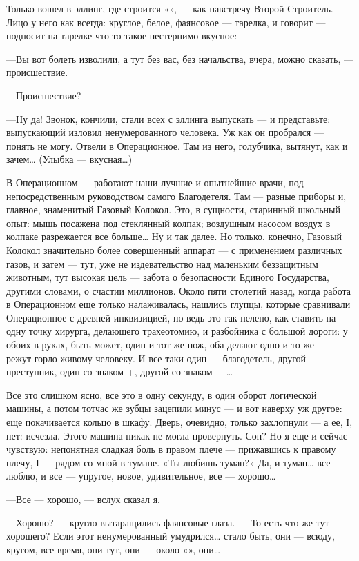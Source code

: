 \documentclass[11pt,openany]{book}
\begin{document}
Только вошел в эллинг, где строится «», --- как навстречу Второй Строитель. Лицо у него как всегда: круглое, белое, фаянсовое --- тарелка, и говорит --- подносит на тарелке что-то такое нестерпимо-вкусное:

---Вы вот болеть изволили, а тут без вас, без начальства, вчера, можно сказать, --- происшествие.

---Происшествие?

---Ну да! Звонок, кончили, стали всех с эллинга выпускать --- и представьте: выпускающий изловил ненумерованного человека. Уж как он пробрался --- понять не могу. Отвели в Операционное. Там из него, голубчика, вытянут, как и зачем\ldots{} (Улыбка --- вкусная\ldots{})

В Операционном --- работают наши лучшие и опытнейшие врачи, под непосредственным руководством самого Благодетеля. Там --- разные приборы и, главное, знаменитый Газовый Колокол. Это, в сущности, старинный школьный опыт: мышь посажена под стеклянный колпак; воздушным насосом воздух в колпаке разрежается все больше\ldots{} Ну и так далее. Но только, конечно, Газовый Колокол значительно более совершенный аппарат --- с применением различных газов, и затем --- тут,  уже не издевательство над маленьким беззащитным животным, тут высокая цель --- забота о безопасности Единого Государства, другими словами, о счастии миллионов. Около пяти столетий назад, когда работа в Операционном еще только налаживалась, нашлись глупцы, которые сравнивали Операционное с древней инквизицией, но ведь это так нелепо, как ставить на одну точку хирурга, делающего трахеотомию, и разбойника с большой дороги: у обоих в руках, быть может, один и тот же нож, оба делают одно и то же --- режут горло живому человеку. И все-таки один --- благодетель, другой --- преступник, один со знаком +, другой со знаком − \ldots{}

Все это слишком ясно, все это в одну секунду, в один оборот логической машины, а потом тотчас же зубцы зацепили минус --- и вот наверху уж другое: еще покачивается кольцо в шкафу. Дверь, очевидно, только захлопнули --- а ее, I, нет: исчезла. Этого машина никак не могла провернуть. Сон? Но я еще и сейчас чувствую: непонятная сладкая боль в правом плече --- прижавшись к правому плечу, I --- рядом со мной в тумане. «Ты любишь туман?» Да, и туман\ldots{} все люблю, и все --- упругое, новое, удивительное, все --- хорошо\ldots{}

---Все --- хорошо, --- вслух сказал я.

---Хорошо? --- кругло вытаращились фаянсовые глаза. --- То есть что же тут хорошего? Если этот ненумерованный умудрился\ldots{} стало быть, они --- всюду, кругом, все время, они тут, они --- около «», они\ldots{}
\end{document}
